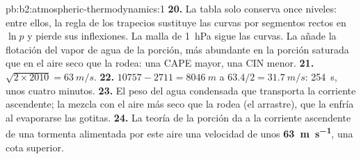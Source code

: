 \begin{solution}{pb:b2:atmospheric-thermodynamics:1}
\textbf{20.} La tabla solo conserva once niveles: entre ellos, la regla de los trapecios sustituye las
curvas por segmentos rectos en $\ln p$ y pierde sus inflexiones. La malla de \qty{1}{hPa} sigue las curvas. La 
añade la flotación del vapor de agua de la porción, más abundante en la porción saturada que en
el aire seco que la rodea: una CAPE mayor, una CIN menor.
\textbf{21.} $\sqrt{2 \times 2010} = \qty{63}{m/s}$.
\textbf{22.} $10757 - 2711 = \qty{8046}{m}$ a $63.4/2 = \qty{31.7}{m/s}$: \qty{254}{s}, unos cuatro
minutos.
\textbf{23.} El peso del agua condensada que transporta la corriente ascendente; la mezcla con el aire más seco
que la rodea (el arrastre), que la enfría al evaporarse las gotitas.
\textbf{24.} La teoría de la porción da a la corriente ascendente de una tormenta alimentada por este aire una velocidad de unos
\textbf{\qty[text-series-to-math=true]{63}{m.s^{-1}}}, una cota superior.
\end{solution}

